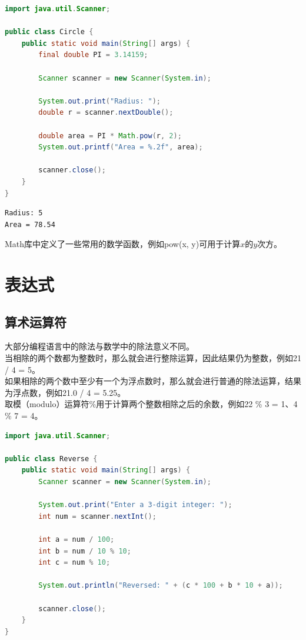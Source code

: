 \vspace{0.5cm}


\begin{lstlisting}[language=Java]
import java.util.Scanner;

public class Circle {
	public static void main(String[] args) {
		final double PI = 3.14159;

		Scanner scanner = new Scanner(System.in);

		System.out.print("Radius: ");
		double r = scanner.nextDouble();

		double area = PI * Math.pow(r, 2);
		System.out.printf("Area = %.2f", area);
	
		scanner.close();
	}
}	
\end{lstlisting}

\begin{tcolorbox}
	\begin{verbatim}
Radius: 5
Area = 78.54
	\end{verbatim}
\end{tcolorbox}

Math库中定义了一些常用的数学函数，例如pow(x, y)可用于计算$ x $的$ y $次方。\\

\newpage

\section{表达式}

\subsection{算术运算符}

大部分编程语言中的除法与数学中的除法意义不同。\\

当相除的两个数都为整数时，那么就会进行整除运算，因此结果仍为整数，例如21 / 4 = 5。\\

如果相除的两个数中至少有一个为浮点数时，那么就会进行普通的除法运算，结果为浮点数，例如21.0 / 4 = 5.25。\\

取模（modulo）运算符\%用于计算两个整数相除之后的余数，例如22 \% 3 = 1、4 \% 7 = 4。\\


\begin{lstlisting}[language=Java]
import java.util.Scanner;

public class Reverse {
	public static void main(String[] args) {
		Scanner scanner = new Scanner(System.in);

		System.out.print("Enter a 3-digit integer: ");
		int num = scanner.nextInt();

		int a = num / 100;
		int b = num / 10 % 10;
		int c = num % 10;

		System.out.println("Reversed: " + (c * 100 + b * 10 + a));

		scanner.close();
	}
}
\end{lstlisting}

